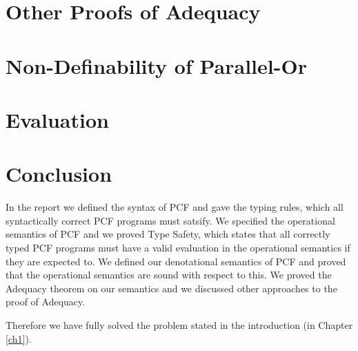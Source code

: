 \documentclass{bhamthesis}
\begin{document}
\chapter{Other Proofs of Adequacy}\label{ch8}





\chapter{Non-Definability of Parallel-Or}



\chapter{Evaluation}\label{ch9}



\chapter{Conclusion}\label{ch10}
In the report we defined the syntax of PCF and gave the typing rules, which all syntactically correct PCF programs must satsify. We specified the operational semantics of PCF and we proved Type Safety, which states that all correctly typed PCF programs must have a valid evaluation in the operational semantics if they are expected to.
We defined our denotational semantics of PCF and proved that the operational semantics are sound with respect to this. We proved the Adequacy theorem on our semantics and we discussed other approaches to the proof of Adequacy.

Therefore we have fully solved the problem stated in the introduction (in Chapter \ref{ch1}).



\end{document}
